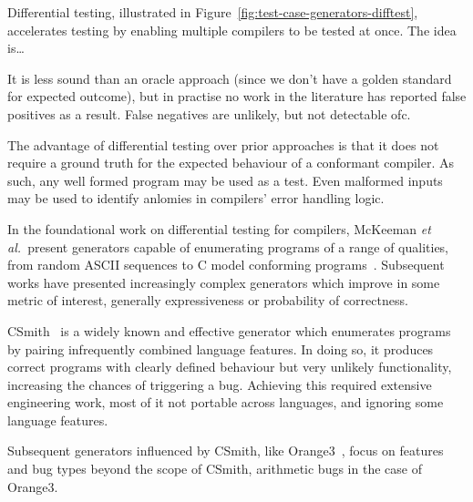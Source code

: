 Differential testing, illustrated in Figure~\ref{fig:test-case-generators-difftest}, accelerates testing by enabling multiple compilers to be tested at once. The idea is\ldots


It is less sound than an oracle approach (since we don't have a golden standard for expected outcome), but in practise no work in the literature has reported false positives as a result. False negatives are unlikely, but not detectable ofc.

The advantage of differential testing over prior approaches is that it does not require a ground truth for the expected behaviour of a conformant compiler. As such, any well formed program may be used as a test. Even malformed inputs may be used to identify anlomies in compilers' error handling logic.

In the foundational work on differential testing for compilers, McKeeman \emph{et al.\ }present generators capable of enumerating programs of a range of qualities, from random ASCII sequences to C model conforming programs~\cite{McKeeman1998}. Subsequent works have presented increasingly complex generators which improve in some metric of interest, generally expressiveness or probability of correctness.

CSmith~\cite{Yang2011} is a widely known and effective generator which enumerates programs by pairing infrequently combined language features. In doing so, it produces correct programs with clearly defined behaviour but very unlikely functionality, increasing the chances of triggering a bug. Achieving this required extensive engineering work, most of it not portable across languages, and ignoring some language features.


Subsequent generators influenced by CSmith, like Orange3~\cite{Nagai2013}, focus on features and bug types beyond the scope of CSmith, arithmetic bugs in the case of Orange3.

